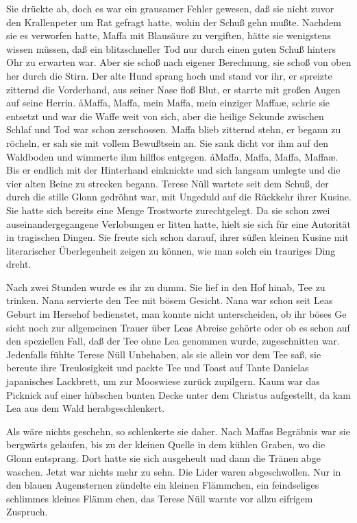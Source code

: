 Sie drückte ab, doch es war ein grausamer Fehler gewesen,
daß sie nicht zuvor den Krallenpeter um Rat gefragt hatte,
wohin der Schuß gehn mußte. Nachdem sie es verworfen
hatte, Maffa mit Blausäure zu vergiften, hätte sie wenigstens
wissen müssen, daß ein blitzschneller Tod nur durch einen guten
Schuß hinters Ohr zu erwarten war. Aber sie schoß nach eigener
Berechnung, sie schoß von oben her durch die Stirn. Der alte
Hund sprang hoch und stand vor ihr, er spreizte zitternd die
Vorderhand, aus seiner Nase floß Blut, er starrte mit großen
Augen auf seine Herrin. \aa{}Maffa, Maffa, mein Maffa, mein
einziger Maffa\ae{}, schrie sie entsetzt und war die Waffe weit
von sich, aber die heilige Sekunde zwischen Schlaf und Tod
war schon zerschossen. Maffa blieb zitternd stehn, er begann
zu röcheln, er sah sie mit vollem Bewußtsein an. Sie sank
dicht vor ihm auf den Waldboden und wimmerte ihm hilf\/los
entgegen. \aa{}Maffa, Maffa, Maffa, Maffa\ae{}. Bis er endlich mit
der Hinterhand einknickte und sich langsam umlegte und die
vier alten Beine zu strecken begann.
\abstand{}
Terese Nüll wartete seit dem Schuß, der durch die stille Glonn
gedröhnt war, mit Ungeduld auf die Rückkehr ihrer Kusine.
Sie hatte sich bereits eine Menge Trostworte zurechtgelegt.
Da sie schon zwei auseinandergegangene Verlobungen er\-%
litten hatte, hielt sie sich für eine Autorität in tragischen
Dingen. Sie freute sich schon darauf, ihrer süßen kleinen
Kusine mit literarischer Überlegenheit zeigen zu können,
wie man solch ein trauriges Ding dreht.

Nach zwei Stunden wurde es ihr zu dumm. Sie lief in den
Hof hinab, Tee zu trinken. Nana servierte den Tee mit bösem
Gesicht. Nana war schon seit Leas Geburt im Hersehof
bedienstet, man konnte nicht unterscheiden, ob ihr böses Ge\-%
sicht noch zur allgemeinen Trauer über Leas Abreise gehörte
oder ob es schon auf den speziellen Fall, daß der Tee ohne
Lea genommen wurde, zugeschnitten war. Jedenfalls fühlte
Terese Nüll Unbehaben, als sie allein vor dem Tee saß, sie
bereute ihre Treulosigkeit und packte Tee und Toast auf Tante
Danielas japanisches Lackbrett, um zur Mooswiese zurück\-%
zupilgern. Kaum war das Picknick auf einer hübschen bunten
Decke unter dem Christus aufgestellt, da kam Lea aus dem
Wald herabgeschlenkert.

Als wäre nichts geschehn, so schlenkerte sie daher. Nach Maffas
Begräbnis war sie bergwärts gelaufen, bis zu der kleinen
Quelle in dem kühlen Graben, wo die Glonn entsprang.
Dort hatte sie sich ausgeheult und dann die Tränen abge\-%
waschen. Jetzt war nichts mehr zu sehn. Die Lider waren
abgeschwollen. Nur in den blauen Augensternen zündelte ein
kleinen Flämmchen, ein feindseliges schlimmes kleines Flämm\-%
chen, das Terese Nüll warnte vor allzu eifrigem Zuspruch.

